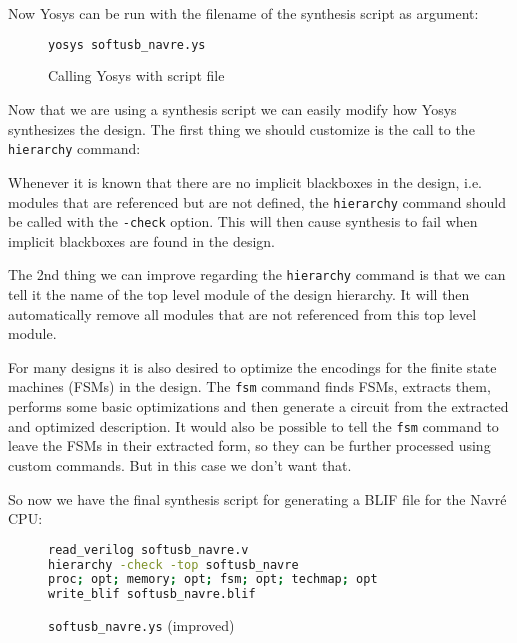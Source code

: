 \documentclass[9pt,technote,a4paper]{IEEEtran}
\begin{document}
Now Yosys can be run with the filename of the synthesis script as argument:

\begin{figure}[H]
\begin{lstlisting}[language=sh]
yosys softusb_navre.ys
\end{lstlisting}
 \renewcommand{\figurename}{Listing}
\caption{Calling Yosys with script file}
\end{figure}

\medskip

Now that we are using a synthesis script we can easily modify how Yosys
synthesizes the design. The first thing we should customize is the
call to the {\tt hierarchy} command:

Whenever it is known that there are no implicit blackboxes in the design, i.e.
modules that are referenced but are not defined, the {\tt hierarchy} command
should be called with the {\tt -check} option. This will then cause synthesis
to fail when implicit blackboxes are found in the design.

The 2nd thing we can improve regarding the {\tt hierarchy} command is that we
can tell it the name of the top level module of the design hierarchy. It will
then automatically remove all modules that are not referenced from this top
level module.

\medskip

For many designs it is also desired to optimize the encodings for the finite
state machines (FSMs) in the design. The {\tt fsm} command finds FSMs, extracts
them, performs some basic optimizations and then generate a circuit from
the extracted and optimized description. It would also be possible to tell
the {\tt fsm} command to leave the FSMs in their extracted form, so they can be
further processed using custom commands. But in this case we don't want that.

\medskip

So now we have the final synthesis script for generating a BLIF file
for the Navré CPU:

\begin{figure}[H]
\begin{lstlisting}[language=sh]
read_verilog softusb_navre.v
hierarchy -check -top softusb_navre
proc; opt; memory; opt; fsm; opt; techmap; opt
write_blif softusb_navre.blif
\end{lstlisting}
 \renewcommand{\figurename}{Listing}
\caption{{\tt softusb\_navre.ys} (improved)}
\end{figure}
\end{document}
